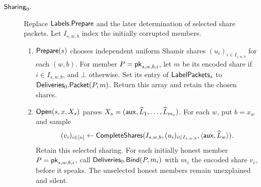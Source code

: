 \begin{description}
\item[$\mathsf{Sharing}_0$.]\label{hook:sharing}
 Replace $\mathsf{Labels}.\mathsf{Prepare}$ and the later determination of selected
 share packets.  Let $I_{s,w,b}$ index the initially corrupted members.
 \begin{enumerate}
 \item $\mathsf{Prepare}(s)$ chooses independent uniform Shamir shares
   $(u_i)_{i\in I_{s,w,b}}$ for each $(w,b)$.
   For member $P=\mathsf{pk}_{s,w,b,i}$, let $m$ be its encoded share if
   $i\in I_{s,w,b}$, and $\bot$ otherwise.  Set its entry of
   $\mathsf{LabelPackets}_s$ to $\mathsf{Deliveries}_0.\mathsf{Packet}(P,m)$.
   Return this array and retain the chosen shares.
 \item $\mathsf{Open}(s,x,X_s)$ parses
   $X_s=(\mathsf{aux},\widehat L_1,\ldots,\widehat L_{m_s})$.
   For each $w$, put $b=x_w$ and sample
   \[
    (v_i)_{i\in[n]}\mathrel{\leftarrow}
      \mathsf{CompleteShares}(I_{s,w,b},(u_i)_{i\in I_{s,w,b}},
                       \langle\mathsf{aux},\widehat L_w\rangle).
   \]
   Retain this selected sharing.  For each initially honest member
   $P=\mathsf{pk}_{s,w,b,i}$, call $\mathsf{Deliveries}_0.\mathsf{Bind}(P,m_i)$ with $m_i$
   the encoded share $v_i$, before it speaks.
   The unselected honest members remain unexplained and silent.
 \end{enumerate}


\end{description}
